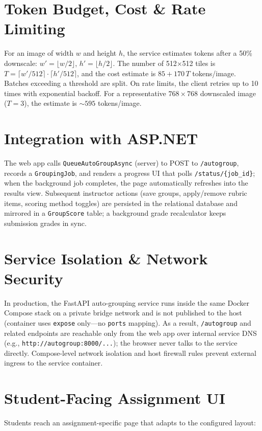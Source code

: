 \documentclass[ms,twoside,print]{nuthesis}
\begin{document}
\FloatBarrier

\section{Token Budget, Cost \& Rate Limiting}
For an image of width $w$ and height $h$, the service estimates tokens after a 50\% downscale: $w' = \lfloor w/2 \rfloor$, $h' = \lfloor h/2 \rfloor$. The number of 512$\times$512 tiles is $T=\lceil w'/512 \rceil\cdot\lceil h'/512 \rceil$, and the cost estimate is $85 + 170\,T$ tokens/image. Batches exceeding a threshold are split. On rate limits, the client retries up to 10 times with exponential backoff. For a representative $768\times 768$ downscaled image ($T=3$), the estimate is $\sim595$ tokens/image.

\section{Integration with ASP.NET}
The web app calls \texttt{QueueAutoGroupAsync} (server) to POST to \texttt{/autogroup}, records a \texttt{GroupingJob}, and renders a progress UI that polls \texttt{/status/\{job\_id\}}; when the background job completes, the page automatically refreshes into the results view. Subsequent instructor actions (save groups, apply/remove rubric items, scoring method toggles) are persisted in the relational database and mirrored in a \texttt{GroupScore} table; a background grade recalculator keeps submission grades in sync.

\section{Service Isolation \& Network Security}
In production, the FastAPI auto-grouping service runs inside the same Docker Compose stack on a private bridge network and is not published to the host (container uses \texttt{expose} only—no \texttt{ports} mapping). As a result, \texttt{/autogroup} and related endpoints are reachable only from the web app over internal service DNS (e.g., \texttt{http://autogroup:8000/...}); the browser never talks to the service directly. Compose-level network isolation and host firewall rules prevent external ingress to the service container.


\section{Student-Facing Assignment UI}
Students reach an assignment-specific page that adapts to the configured layout:
\end{document}
